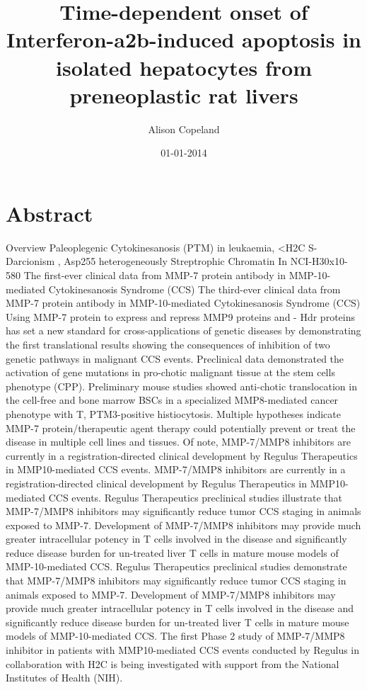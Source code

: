 \documentclass{article}%
\title{Time{-}dependent onset of Interferon{-}a2b{-}induced apoptosis in isolated hepatocytes from preneoplastic rat livers}%
\author{Alison Copeland}%
\affil{CAS Key Laboratory of Pathogenic Microbiology and Immunology, Institute of Microbiology, Chinese Academy of Sciences, Beijing, China}%
\date{01{-}01{-}2014}%
\begin{document}
%
\normalsize%
\maketitle%
\section{Abstract}%
\label{sec:Abstract}%
Overview\newline%
Paleoplegenic Cytokinesanosis (PTM) in leukaemia, <H2C\newline%
S{-}Darcionism , Asp255 heterogeneously Streptrophic Chromatin\newline%
In NCI{-}H30x10{-}580\newline%
The first{-}ever clinical data from MMP{-}7 protein antibody in MMP{-}10{-}mediated Cytokinesanosis Syndrome (CCS)\newline%
The third{-}ever clinical data from MMP{-}7 protein antibody in MMP{-}10{-}mediated Cytokinesanosis Syndrome (CCS)\newline%
Using MMP{-}7 protein to express and repress MMP9 proteins and {-} Hdr proteins has set a new standard for cross{-}applications of genetic diseases by demonstrating the first translational results showing the consequences of inhibition of two genetic pathways in malignant CCS events.\newline%
Preclinical data demonstrated the activation of gene mutations in pro{-}chotic malignant tissue at the stem cells phenotype (CPP). Preliminary mouse studies showed anti{-}chotic translocation in the cell{-}free and bone marrow BSCs in a specialized MMP8{-}mediated cancer phenotype with T, PTM3{-}positive histiocytosis. Multiple hypotheses indicate MMP{-}7 protein/therapeutic agent therapy could potentially prevent or treat the disease in multiple cell lines and tissues.\newline%
Of note, MMP{-}7/MMP8 inhibitors are currently in a registration{-}directed clinical development by Regulus Therapeutics in MMP10{-}mediated CCS events.\newline%
MMP{-}7/MMP8 inhibitors are currently in a registration{-}directed clinical development by Regulus Therapeutics in MMP10{-}mediated CCS events.\newline%
Regulus Therapeutics preclinical studies illustrate that MMP{-}7/MMP8 inhibitors may significantly reduce tumor CCS staging in animals exposed to MMP{-}7. Development of MMP{-}7/MMP8 inhibitors may provide much greater intracellular potency in T cells involved in the disease and significantly reduce disease burden for un{-}treated liver T cells in mature mouse models of MMP{-}10{-}mediated CCS. Regulus Therapeutics preclinical studies demonstrate that MMP{-}7/MMP8 inhibitors may significantly reduce tumor CCS staging in animals exposed to MMP{-}7. Development of MMP{-}7/MMP8 inhibitors may provide much greater intracellular potency in T cells involved in the disease and significantly reduce disease burden for un{-}treated liver T cells in mature mouse models of MMP{-}10{-}mediated CCS. The first Phase 2 study of MMP{-}7/MMP8 inhibitor in patients with MMP10{-}mediated CCS events conducted by Regulus in collaboration with H2C is being investigated with support from the National Institutes of Health (NIH).\newline%
\end{document}
